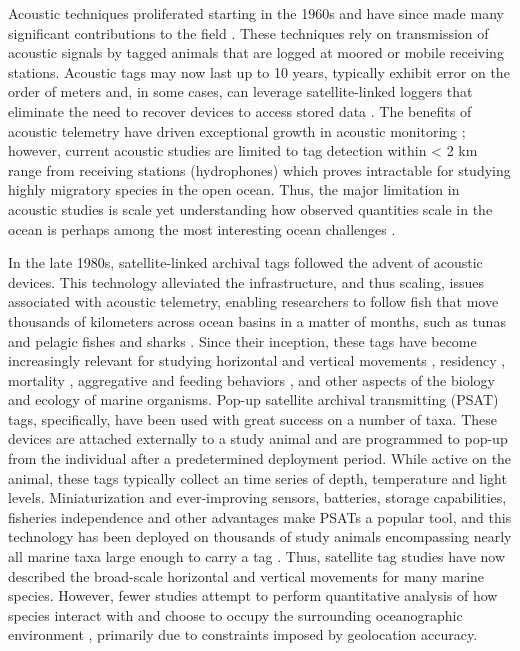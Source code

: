 Acoustic techniques proliferated starting in the 1960s and have since made many significant contributions to the field \citep[\eg][]{Carey1981, Carey1990}. These techniques rely on transmission of acoustic signals by tagged animals that are logged at moored or mobile receiving stations. Acoustic tags may now last up to 10 years, typically exhibit error on the order of meters and, in some cases, can leverage satellite-linked loggers that eliminate the need to recover devices to access stored data \citep{Donaldson2014}. The benefits of acoustic telemetry have driven exceptional growth in acoustic monitoring \citep{Hussey2015}; however, current acoustic studies are limited to tag detection within < 2 km range from receiving stations (\eg hydrophones) which proves intractable for studying highly migratory species in the open ocean. Thus, the major limitation in acoustic studies is scale yet understanding how observed quantities scale in the ocean is perhaps among the most interesting ocean challenges \citep{Stommel1963, Haury1978}. 

In the late 1980s, satellite-linked archival tags followed the advent of acoustic devices. This technology alleviated the \is infrastructure, and thus scaling, issues associated with acoustic telemetry, enabling researchers to follow fish that move thousands of kilometers across ocean basins in a matter of months, such as tunas \citep{Block2005} and pelagic fishes and sharks \citep{Block2011}. Since their inception, these tags have become increasingly relevant \citep{Hussey2015} for studying horizontal and vertical movements \citep{Block2011, Thorrold2014, Berumen2014}, residency \citep{Domeier2006}, mortality \citep{Musyl2011a}, aggregative and feeding behaviors \citep{Jorgensen2012}, and other aspects of the biology and ecology of marine organisms. Pop-up satellite archival transmitting (PSAT) tags, specifically, have been used with great success on a number of taxa. These devices are attached externally to a study animal and are programmed to pop-up from the individual after a predetermined deployment period. While active on the animal, these tags typically collect an \is time series of depth, temperature and light levels. Miniaturization and ever-improving sensors, batteries, storage capabilities, fisheries independence and other advantages make PSATs a popular tool, and this technology has been deployed on thousands of study animals encompassing nearly all marine taxa large enough to carry a tag \citep{Hussey2015}. Thus, satellite tag studies have now described the broad-scale horizontal and vertical movements for many marine species. However, fewer studies attempt to perform quantitative analysis of how species interact with and choose to occupy the surrounding oceanographic environment \citep[except see, for example,][]{Lawson2010}, primarily due to constraints imposed by geolocation accuracy.

